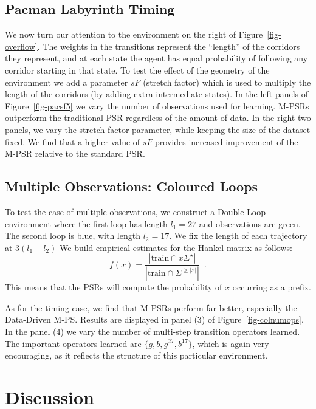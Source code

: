 \documentclass[letterpaper]{article}
\newcommand{\sstar}{\Sigma^\star}
\begin{document}
\subsection{Pacman Labyrinth Timing}

We now turn our attention to the environment on the right of Figure~\ref{fig-overflow}. The weights in the transitions represent the ``length'' of the corridors they represent, and at each state the agent has equal probability of following any corridor starting in that state. To test the effect of the geometry of the environment we add a parameter $sF$ (stretch factor) which is used to multiply the length of the corridors (by adding extra intermediate states). In the left panels of Figure~\ref{fig-pacsf5} we vary the number of observations used for learning. M-PSRs outperform the traditional PSR regardless of the amount of data. In the right two panels, we vary the stretch factor parameter, while  keeping the size of the dataset fixed. We find that a higher value of $sF$ provides increased improvement of the M-PSR relative to the standard PSR.

\subsection{Multiple Observations: Coloured Loops}

To test the case of multiple observations, we construct a Double Loop environment where the first loop has length $l_1=27$ and observations are green. The second loop is blue, with length $l_2=17$. We fix the length of each trajectory at 
$3 (l_1 + l_2)$
We build empirical estimates for the Hankel matrix as follows:
\begin{equation*}
f(x) = \frac{|\mathrm{train} \cap x \sstar |}{|\mathrm{train} \cap \Sigma^{\geq |x|}|} \enspace.
\end{equation*}  
This means that the PSRs will compute the probability of $x$ occurring as a prefix.

As for the timing case, we find that M-PSRs perform far better, especially the Data-Driven M-PS. Results are displayed in panel (3) of Figure~\ref{fig-colnumops}. In the panel (4) we vary the number of multi-step transition operators learned. The important operators learned are $\{g,b,g^{27},b^{17}\}$, which is again very encouraging, as it reflects the structure of this particular environment.

\section{Discussion}
\end{document}
